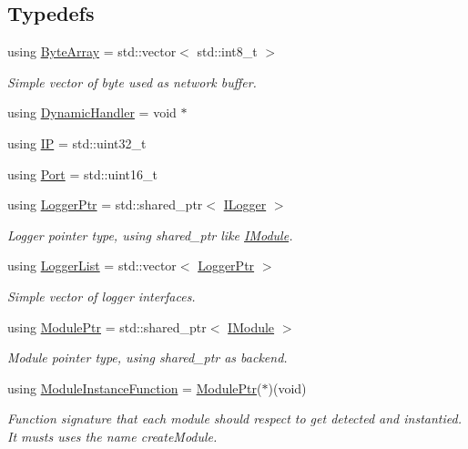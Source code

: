 \subsection*{Typedefs}
\begin{DoxyCompactItemize}
\item 
using \mbox{\hyperlink{namespaceo_z_abfa3f5a46e5c7584615dc1dd33fcafb6}{Byte\+Array}} = std\+::vector$<$ std\+::int8\+\_\+t $>$
\begin{DoxyCompactList}\small\item\em Simple vector of byte used as network buffer. \end{DoxyCompactList}\item 
using \mbox{\hyperlink{namespaceo_z_a4f8ae5685d0f7dca498d73129b482f2d}{Dynamic\+Handler}} = void $\ast$
\item 
using \mbox{\hyperlink{namespaceo_z_ace55c2d0182a14ceea9649d0d0cf9c4a}{IP}} = std\+::uint32\+\_\+t
\item 
using \mbox{\hyperlink{namespaceo_z_afeccb82d451972ba3b7d2a32b066b30b}{Port}} = std\+::uint16\+\_\+t
\item 
using \mbox{\hyperlink{namespaceo_z_aaa2fbabbfafc6616a7e69651b62a3d4e}{Logger\+Ptr}} = std\+::shared\+\_\+ptr$<$ \mbox{\hyperlink{classo_z_1_1_i_logger}{I\+Logger}} $>$
\begin{DoxyCompactList}\small\item\em Logger pointer type, using shared\+\_\+ptr like \mbox{\hyperlink{classo_z_1_1_i_module}{I\+Module}}. \end{DoxyCompactList}\item 
using \mbox{\hyperlink{namespaceo_z_a2d18a70272709242e8e7ebffc3f1806c}{Logger\+List}} = std\+::vector$<$ \mbox{\hyperlink{namespaceo_z_aaa2fbabbfafc6616a7e69651b62a3d4e}{Logger\+Ptr}} $>$
\begin{DoxyCompactList}\small\item\em Simple vector of logger interfaces. \end{DoxyCompactList}\item 
using \mbox{\hyperlink{namespaceo_z_af5a56aaaee027504979038f38991adcf}{Module\+Ptr}} = std\+::shared\+\_\+ptr$<$ \mbox{\hyperlink{classo_z_1_1_i_module}{I\+Module}} $>$
\begin{DoxyCompactList}\small\item\em Module pointer type, using shared\+\_\+ptr as backend. \end{DoxyCompactList}\item 
using \mbox{\hyperlink{namespaceo_z_ac1fa0fdab4bd08a5e127651d1f4150a2}{Module\+Instance\+Function}} = \mbox{\hyperlink{namespaceo_z_af5a56aaaee027504979038f38991adcf}{Module\+Ptr}}($\ast$)(void)
\begin{DoxyCompactList}\small\item\em Function signature that each module should respect to get detected and instantied. It musts uses the name \textquotesingle{}create\+Module\textquotesingle{}. \end{DoxyCompactList}\end{DoxyCompactItemize}
